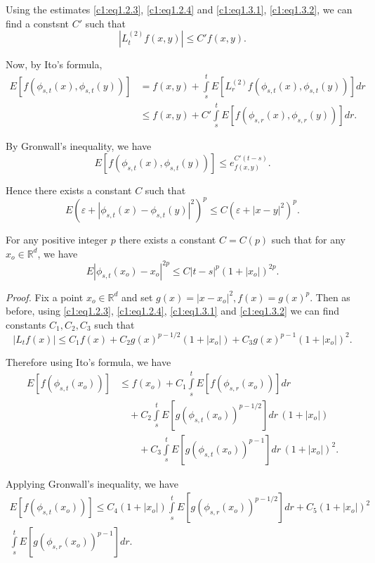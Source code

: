 Using the estimates \eqref{c1:eq1.2.3}, \eqref{c1:eq1.2.4} and 
\eqref{c1:eq1.3.1}, \eqref{c1:eq1.3.2}, we can
find a constsnt $C'$ such that  
$$
|L^{(2)}_t f (x,y)| \le C' f(x,y).
$$


Now, by Ito's formula,
\begin{align*}
  E[f(\phi_{s,t} (x),\phi_{s,t} (y))] &= f(x,y) + \int\limits_s^t
  E[L^{(2)}_rf(\phi_{s,t} (x),\phi_{s,t} (y))]dr \\ 
  & \le f(x,y) + C' \int\limits_s^t E[f(\phi_{s,r} (x),\phi_{s,r} (y))]dr. 
\end{align*}

By Gronwall's inequality, we have
$$
 E[f(\phi_{s,t} (x),\phi_{s,t} (y))] \le e^{C'(t-s)}_{f(x,y)}. 
$$

Hence there exists a constant $C$ such that
$$
E(\varepsilon +|\phi_{s,t} (x) - \phi_{s,t} (y)|^2)^p \le C
(\varepsilon + |x-y|^2)^p. 
$$

\begin{Lemma}\label{c1:lem1.3.4}\pageoriginale%
  For any positive integer $p$ there exists a constant $C=C(p)$ such
  that for any $x_o \in \mathbb{R}^d$, we have 
\begin{equation*} 
E |\phi_{s,t} ( x_o ) - x_o|^{2p} \le C|t-s|^p 
(1+|x_o|)^{2p}. \tag{1.3.4}\label{c1:eq1.3.4}
\end{equation*}
\end{Lemma}

\noindent\textit{Proof.}
Fix a point $x_o \in \mathbb{R}^d$ and set $g (x)=
|x-x_o|^2,f(x)=g(x)^p$. Then as before, using
\eqref{c1:eq1.2.3}, \eqref{c1:eq1.2.4}, 
\eqref{c1:eq1.3.1} and \eqref{c1:eq1.3.2} we can find constants $C_1,C_2,C_3$
such that  
\begin{equation*}
|L_t f(x)| \le C_1 f(x) + C_2 g(x)^{p- 1/2} (1+|x_o|) + C_3 g(x)^{p-1}
(1+|x_o|)^2. \tag*{$\Box$}
\end{equation*}

Therefore using Ito's formula, we have
\begin{align*}
E[f(\phi_{s,t} (x_o))] & \le f(x_o) + C_1 \int\limits_s^t E[f
(\phi_{s,r}(x_o))]dr\\ 
&\quad + C_2 \int\limits_s^t E[g(\phi_{s,t} (x_o))^{p-1/2}]dr\, (1+|x_o|)\\
&\qquad + C_3 \int\limits_s^t E[g(\phi_{s,t} (x_o))^{p-1}]dr \,(1+|x_o|)^2.
\end{align*}

Applying Gronwall's inequality, we have
\begin{multline*}
  E[f(\phi_{s,t} (x_o))] \le C_4 (1+ |x_o|) \int\limits_s^t
  E[g(\phi_{s,r} (x_o))^{p-1/2}]dr + C_5 (1+|x_o|)^2\\ 
  \int\limits_s^t
  E[g(\phi_{s,r} (x_o))^{p-1}]dr. \tag{1.3.5}\label{c1:eq1.3.5} 
\end{multline*}

